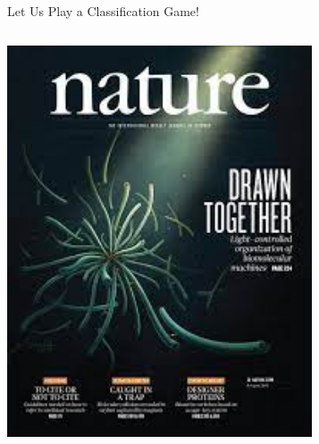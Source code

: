 \documentclass[notes, aspectratio=1610]{beamer}
\begin{document}
\begin{frame}{Let Us Play a Classification Game!}
\begin{columns}
\begin{column}{0.25\textwidth}
			\includegraphics[width=1\textwidth]{images/nature}
		\end{column}
		\begin{column}{0.25\textwidth}

\end{column}
\end{columns}
\end{frame}
\end{document}
